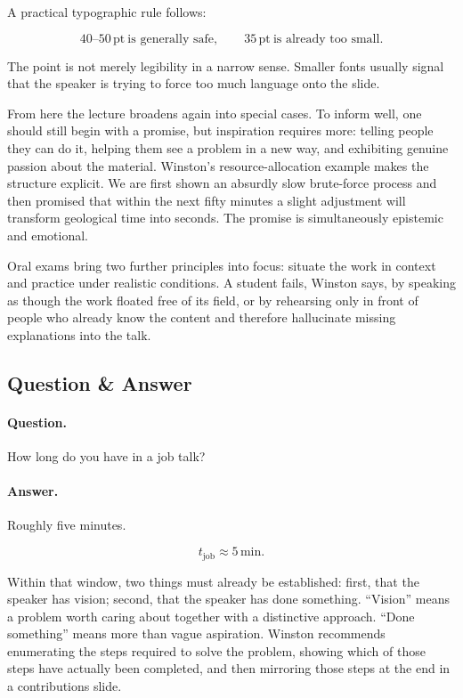 A practical typographic rule follows:

\begin{equation}
40\text{--}50\,\mathrm{pt}\ \text{is generally safe}, \qquad 35\,\mathrm{pt}\ \text{is already too small.}
\end{equation}

The point is not merely legibility in a narrow sense. Smaller fonts usually signal that the speaker is trying to force too much language onto the slide.

From here the lecture broadens again into special cases. To inform well, one should still begin with a promise, but inspiration requires more: telling people they can do it, helping them see a problem in a new way, and exhibiting genuine passion about the material. Winston's resource-allocation example makes the structure explicit. We are first shown an absurdly slow brute-force process and then promised that within the next fifty minutes a slight adjustment will transform geological time into seconds. The promise is simultaneously epistemic and emotional.

Oral exams bring two further principles into focus: situate the work in context and practice under realistic conditions. A student fails, Winston says, by speaking as though the work floated free of its field, or by rehearsing only in front of people who already know the content and therefore hallucinate missing explanations into the talk.

\subsection{Question \& Answer}

\paragraph{Question.} How long do you have in a job talk?

\paragraph{Answer.} Roughly five minutes.

\begin{equation}
t_{\mathrm{job}} \approx 5\,\mathrm{min}.
\end{equation}

Within that window, two things must already be established: first, that the speaker has vision; second, that the speaker has done something. ``Vision'' means a problem worth caring about together with a distinctive approach. ``Done something'' means more than vague aspiration. Winston recommends enumerating the steps required to solve the problem, showing which of those steps have actually been completed, and then mirroring those steps at the end in a contributions slide.

